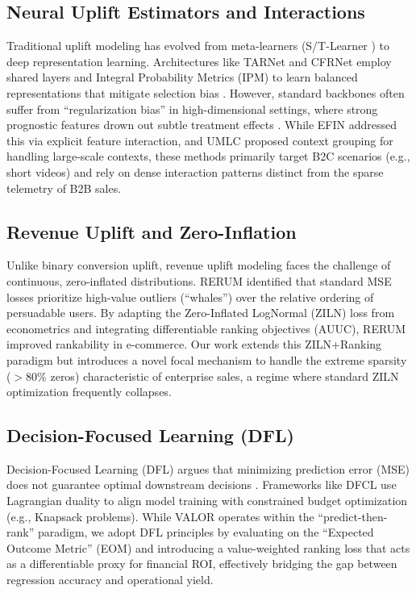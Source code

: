 \documentclass[runningheads]{llncs}
\begin{document}
\subsection{Neural Uplift Estimators and Interactions}
Traditional uplift modeling has evolved from meta-learners (S/T-Learner \cite{kunzel2019metalearners}) to deep representation learning. Architectures like TARNet and CFRNet \cite{shalit2017estimating} employ shared layers and Integral Probability Metrics (IPM) to learn balanced representations that mitigate selection bias \cite{wu2023stable}. However, standard backbones often suffer from ``regularization bias'' in high-dimensional settings, where strong prognostic features drown out subtle treatment effects \cite{efin2023}. While EFIN \cite{efin2023} addressed this via explicit feature interaction\cite{guo2017deepfm,wang2021dcn}, and UMLC \cite{sun2025robust} proposed context grouping for handling large-scale contexts, these methods primarily target B2C scenarios (e.g., short videos) and rely on dense interaction patterns distinct from the sparse telemetry of B2B sales.

\subsection{Revenue Uplift and Zero-Inflation}
Unlike binary conversion uplift, revenue uplift modeling faces the challenge of continuous, zero-inflated distributions. RERUM \cite{rerum2024} identified that standard MSE losses prioritize high-value outliers (``whales'') over the relative ordering of persuadable users. By adapting the Zero-Inflated LogNormal (ZILN) loss from econometrics and integrating differentiable ranking objectives (AUUC), RERUM improved rankability in e-commerce. Our work extends this ZILN+Ranking paradigm but introduces a novel focal mechanism to handle the extreme sparsity ($>80\%$ zeros) characteristic of enterprise sales, a regime where standard ZILN optimization frequently collapses\cite{gubela2020response,DBLP:conf/amcis/GubelaL20}.

\subsection{Decision-Focused Learning (DFL)}
Decision-Focused Learning (DFL) argues that minimizing prediction error (MSE) does not guarantee optimal downstream decisions \cite{dfcl2023}. Frameworks like DFCL \cite{dfcl2023} use Lagrangian duality to align model training with constrained budget optimization (e.g., Knapsack problems). While VALOR operates within the ``predict-then-rank'' paradigm, we adopt DFL principles by evaluating on the ``Expected Outcome Metric'' (EOM) and introducing a value-weighted ranking loss that acts as a differentiable proxy for financial ROI, effectively bridging the gap between regression accuracy and operational yield.
\end{document}
